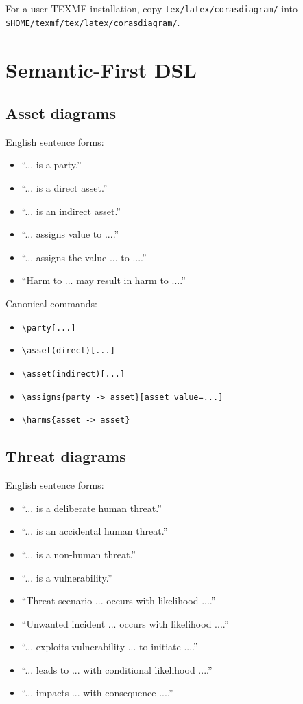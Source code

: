 \documentclass[a4paper]{article}
\begin{document}
For a user TEXMF installation, copy \texttt{tex/latex/corasdiagram/} into
\texttt{\$HOME/texmf/tex/latex/corasdiagram/}.

\section{Semantic-First DSL}

\subsection{Asset diagrams}

English sentence forms:

\begin{itemize}
  \item ``... is a party.''
  \item ``... is a direct asset.''
  \item ``... is an indirect asset.''
  \item ``... assigns value to ....''
  \item ``... assigns the value ... to ....''
  \item ``Harm to ... may result in harm to ....''
\end{itemize}

Canonical commands:

\begin{itemize}
  \item \texttt{\textbackslash party[...]}
  \item \texttt{\textbackslash asset(direct)[...]}
  \item \texttt{\textbackslash asset(indirect)[...]}
  \item \texttt{\textbackslash assigns\{party -> asset\}[asset value=...]}
  \item \texttt{\textbackslash harms\{asset -> asset\}}
\end{itemize}

\subsection{Threat diagrams}

English sentence forms:

\begin{itemize}
  \item ``... is a deliberate human threat.''
  \item ``... is an accidental human threat.''
  \item ``... is a non-human threat.''
  \item ``... is a vulnerability.''
  \item ``Threat scenario ... occurs with likelihood ....''
  \item ``Unwanted incident ... occurs with likelihood ....''
  \item ``... exploits vulnerability ... to initiate ....''
  \item ``... leads to ... with conditional likelihood ....''
  \item ``... impacts ... with consequence ....''
\end{itemize}
\end{document}
